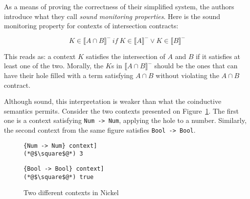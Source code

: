 \documentclass[sigplan,10pt]{acmart}
\newcommand{\nickel}[1]{\lstinline[language=nickel]{#1}}
\begin{document}

As a means of proving the correctness of their simplified system, the
authors introduce what they call \emph{sound monitoring
  properties}. Here is the sound monitoring property for contexts of
intersection contracts:

$$ K \in \llbracket A \cap B \rrbracket^-~if~K \in \llbracket A \rrbracket^- \lor K \in \llbracket B \rrbracket^- $$

This reads as: a context $K$ satisfies the intersection of $A$ and $B$ if it
satisfies at least one of the two. Morally, the $K$s in $\llbracket A \cap B
\rrbracket^-$  should be the ones that can have their hole filled with a term
satisfying $A \cap B$ without violating the $A \cap B$ contract.

Although sound, this interpretation is weaker than what the
coinductive semantics permits. Consider the two contexts presented on
Figure~\ref{fig:valid-contexts}. The first one is a context satisfying
\nickel{Num -> Num}, applying the hole to a number. Similarly, the second context
from the same figure satisfies \nickel{Bool -> Bool}.

\begin{figure}[h]
\begin{lstlisting}[language=nickel, title=\nickel{Num -> Num} context]
(*@$\square$@*) 3
\end{lstlisting}
\begin{lstlisting}[language=nickel, title=\nickel{Bool -> Bool} context]
(*@$\square$@*) true
\end{lstlisting}
\caption{Two different contexts in Nickel}
\label{fig:valid-contexts}
\end{figure}
\end{document}
